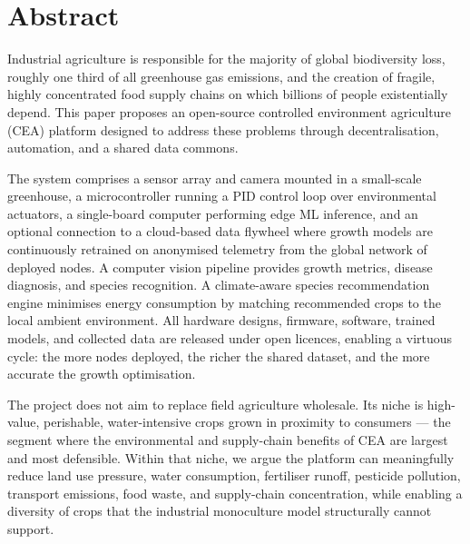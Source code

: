 \section*{Abstract}

Industrial agriculture is responsible for the majority of global biodiversity loss, roughly one third of all greenhouse gas emissions, and the creation of fragile, highly concentrated food supply chains on which billions of people existentially depend. This paper proposes an open-source controlled environment agriculture (CEA) platform designed to address these problems through decentralisation, automation, and a shared data commons.

The system comprises a sensor array and camera mounted in a small-scale greenhouse, a microcontroller running a PID control loop over environmental actuators, a single-board computer performing edge ML inference, and an optional connection to a cloud-based data flywheel where growth models are continuously retrained on anonymised telemetry from the global network of deployed nodes. A computer vision pipeline provides growth metrics, disease diagnosis, and species recognition. A climate-aware species recommendation engine minimises energy consumption by matching recommended crops to the local ambient environment. All hardware designs, firmware, software, trained models, and collected data are released under open licences, enabling a virtuous cycle: the more nodes deployed, the richer the shared dataset, and the more accurate the growth optimisation.

The project does not aim to replace field agriculture wholesale. Its niche is high-value, perishable, water-intensive crops grown in proximity to consumers --- the segment where the environmental and supply-chain benefits of CEA are largest and most defensible. Within that niche, we argue the platform can meaningfully reduce land use pressure, water consumption, fertiliser runoff, pesticide pollution, transport emissions, food waste, and supply-chain concentration, while enabling a diversity of crops that the industrial monoculture model structurally cannot support.
